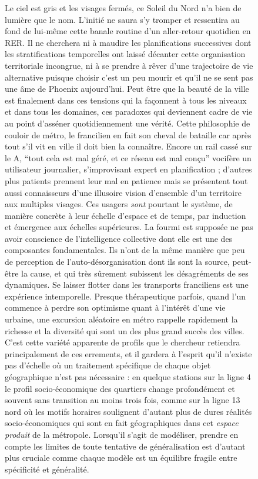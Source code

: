 \begin{figure}[h!]
\begin{mdframed}
Le ciel est gris et les visages fermés, ce Soleil du Nord n'a bien de lumière que le nom. L'initié ne saura s'y tromper et ressentira au fond de lui-même cette banale routine d'un aller-retour quotidien en RER. Il ne cherchera ni à maudire les planifications successives dont les stratifications temporelles ont laissé décanter cette organisation territoriale incongrue, ni à se prendre à rêver d'une trajectoire de vie alternative puisque choisir c'est un peu mourir et qu'il ne se sent pas une âme de Phoenix aujourd'hui. Peut être que la beauté de la ville est finalement dans ces tensions qui la façonnent à tous les niveaux et dans tous les domaines, ces paradoxes qui deviennent cadre de vie au point d'asséner quotidiennement une vérité. Cette philosophie de couloir de métro, le francilien en fait son cheval de bataille car après tout s'il vit en ville il doit bien la connaître. Encore un rail cassé sur le A, ``tout cela est mal géré, et ce réseau est mal conçu'' vocifère un utilisateur journalier, s'improvisant expert en planification ; d'autres plus patients prennent leur mal en patience mais se présentent tout aussi connaisseurs d'une illusoire vision d'ensemble d'un territoire aux multiples visages. Ces usagers \emph{sont} pourtant le système, de manière concrète à leur échelle d'espace et de temps, par induction et émergence aux échelles supérieures. La fourmi est supposée ne pas avoir conscience de l'intelligence collective dont elle est une des composantes fondamentales. Ils n'ont de la même manière que peu de perception de l'auto-désorganisation dont ils sont la source, peut-être la cause, et qui très sûrement subissent les désagréments de ses dynamiques. Se laisser flotter dans les transports franciliens est une expérience intemporelle. Presque thérapeutique parfois, quand l'un commence à perdre son optimisme quant à l'intérêt d'une vie urbaine, une excursion aléatoire en métro rappelle rapidement la richesse et la diversité qui sont un des plus grand succès des villes. C'est cette variété apparente de profils que le chercheur retiendra principalement de ces errements, et il gardera à l'esprit qu'il n'existe pas d'échelle où un traitement spécifique de chaque objet géographique n'est pas nécessaire : en quelque stations sur la ligne 4 le profil socio-économique des quartiers change profondément et souvent sans transition au moins trois fois, comme sur la ligne 13 nord où les motifs horaires soulignent d'autant plus de dures réalités socio-économiques qui sont en fait géographiques dans cet \emph{espace produit} de la métropole. Lorsqu'il s'agit de modéliser, prendre en compte les limites de toute tentative de généralisation est d'autant plus cruciale comme chaque modèle est un équilibre fragile entre spécificité et généralité.


\end{mdframed}
\end{figure}
